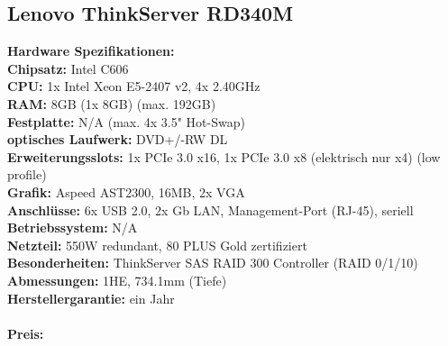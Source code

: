 \documentclass[main.tex]{subfiles}
\begin{document}
\subsection{Lenovo ThinkServer RD340M}
\textbf{Hardware Spezifikationen:} \\
\textbf{Chipsatz:} Intel C606 \\
\textbf{CPU:} 1x Intel Xeon E5-2407 v2, 4x 2.40GHz \\
\textbf{RAM:} 8GB (1x 8GB) (max. 192GB) \\
\textbf{Festplatte:} N/A (max. 4x 3.5" Hot-Swap) \\
\textbf{optisches Laufwerk:} DVD+/-RW DL \\
\textbf{Erweiterungsslots:} 1x PCIe 3.0 x16, 1x PCIe 3.0 x8 (elektrisch nur x4) (low profile) \\
\textbf{Grafik:} Aspeed AST2300, 16MB, 2x VGA \\
\textbf{Anschlüsse:} 6x USB 2.0, 2x Gb LAN, Management-Port (RJ-45), seriell \\
\textbf{Betriebssystem:} N/A \\
\textbf{ Netzteil:} 550W redundant, 80 PLUS Gold zertifiziert \\
\textbf{Besonderheiten:} ThinkServer SAS RAID 300 Controller (RAID 0/1/10) \\
\textbf{Abmessungen:} 1HE, 734.1mm (Tiefe) \\
\textbf{Herstellergarantie:} ein Jahr \\ \\
\textbf{Preis:}  \\ 
	
	
\end{document}
